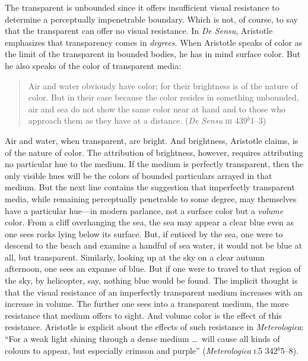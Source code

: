 The transparent is unbounded since it offers insufficient visual resistance to determine a perceptually impenetrable boundary. Which is not, of course, to say that the transparent can offer no visual resistance. In \emph{De Sensu}, Aristotle emphasizes that transparency comes in \emph{degrees}. When Aristotle speaks of color as the limit of the transparent in bounded bodies, he has in mind surface color. But he also speaks of the color of transparent media:
\begin{quote}
    Air and water obviously have color; for their brightness is of the nature of color. But in their case because the color resides in something unbounded, air and sea do not show the same color near at hand and to those who approach them as they have at a distance. (\emph{De Sensu} \textsc{iii} 439\( ^{b} \)1--3)
\end{quote}
Air and water, when transparent, are bright. And brightness, Aristotle claims, is of the nature of color. The attribution of brightness, however, requires attributing no particular hue to the medium. If the medium is perfectly transparent, then the only visible hues will be the colors of bounded particulars arrayed in that medium. But the next line contains the suggestion that imperfectly transparent media, while remaining perceptually penetrable to some degree, may themselves have a particular hue---in modern parlance, not a surface color but a \emph{volume} color. From a cliff overhanging the sea, the sea may appear a clear blue even as one sees rocks lying below its surface. But, if enticed by the sea, one were to descend to the beach and examine a handful of sea water, it would not be blue at all, but transparent. Similarly, looking up at the sky on a clear autumn afternoon, one sees an expanse of blue. But if one were to travel to that region of the sky, by helicopter, say, nothing blue would be found. The implicit thought is that the visual resistance of an imperfectly transparent medium increases with an increase in volume. The further one sees into a transparent medium, the more resistance that medium offers to sight. And volume color is the effect of this resistance. Aristotle is explicit about the effects of such resistance in \emph{Meterologica}: ``For a weak light shining through a dense medium \ldots\ will cause all kinds of colours to appear, but especially crimson and purple'' (\emph{Meterologica} \textsc{i}.5 342\( ^{b} \)5--8).

